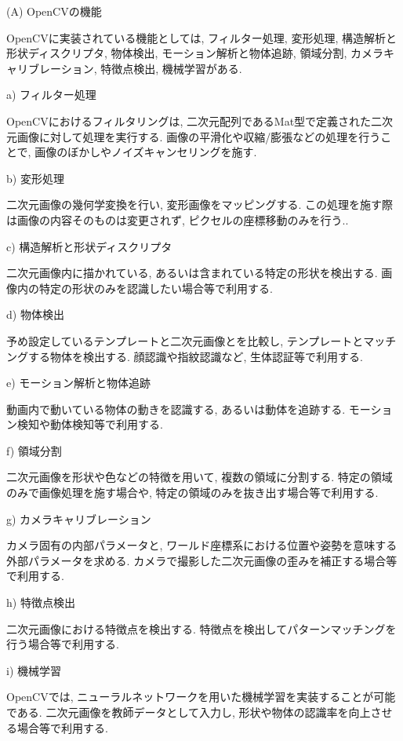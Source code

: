 \begin{description}
\item (A) OpenCVの機能

OpenCVに実装されている機能としては, フィルター処理, 変形処理, 構造解析と形状ディスクリプタ, 物体検出, モーション解析と物体追跡, 領域分割, カメラキャリブレーション, 特徴点検出, 機械学習がある.

\begin{description}
\item a) フィルター処理

OpenCVにおけるフィルタリングは, 二次元配列であるMat型で定義された二次元画像に対して処理を実行する.
画像の平滑化や収縮/膨張などの処理を行うことで, 画像のぼかしやノイズキャンセリングを施す.

\item b) 変形処理

二次元画像の幾何学変換を行い, 変形画像をマッピングする.
この処理を施す際は画像の内容そのものは変更されず, ピクセルの座標移動のみを行う..

\item c) 構造解析と形状ディスクリプタ

二次元画像内に描かれている, あるいは含まれている特定の形状を検出する.
画像内の特定の形状のみを認識したい場合等で利用する.

\item d) 物体検出

予め設定しているテンプレートと二次元画像とを比較し, テンプレートとマッチングする物体を検出する.
顔認識や指紋認識など, 生体認証等で利用する.

\item e) モーション解析と物体追跡

動画内で動いている物体の動きを認識する, あるいは動体を追跡する.
モーション検知や動体検知等で利用する.

\item f) 領域分割

二次元画像を形状や色などの特徴を用いて, 複数の領域に分割する.
特定の領域のみで画像処理を施す場合や, 特定の領域のみを抜き出す場合等で利用する.

\item g) カメラキャリブレーション

カメラ固有の内部パラメータと, ワールド座標系における位置や姿勢を意味する外部パラメータを求める.
カメラで撮影した二次元画像の歪みを補正する場合等で利用する.

\item h) 特徴点検出

二次元画像における特徴点を検出する.
特徴点を検出してパターンマッチングを行う場合等で利用する.

\item i) 機械学習

OpenCVでは, ニューラルネットワークを用いた機械学習を実装することが可能である.
二次元画像を教師データとして入力し, 形状や物体の認識率を向上させる場合等で利用する.
\end{description}

\end{description}

